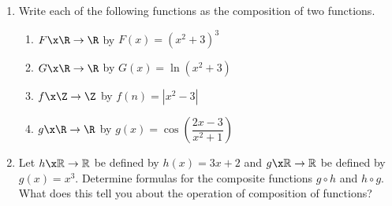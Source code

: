 \begin{prog} \label{prog:decompose} \hfill
\begin{enumerate}
\item Write each of the following functions as the composition of two functions.

\begin{enumerate}
%
%
%

\item $F\x  \R \to \R$ by $F(x) = ( x^2 +3 )^3$

\item $G\x  \R \to \R$ by $G(x) = \ln ( x^2 + 3 )$

\item $f\x  \Z \to \Z$ by $f(n) = | x^2 - 3 |$

\item $g\x  \R \to \R$ by $g(x) = \cos \! \left( \dfrac{2x-3}{x^2+1} \right)$

\end{enumerate}

\item Let  $h\x \mathbb{R} \to \mathbb{R}$ be defined by  $h( x ) = 3x + 2$ and  $g\x \mathbb{R} \to \mathbb{R}$ be defined by  $g( x ) = x^3 $.  Determine formulas for the composite functions  $g \circ h$  and  $h \circ g$.  What does this tell you about the operation of composition of functions?
\end{enumerate}
\end{prog}
\hbreak
%
